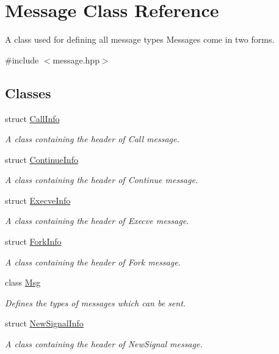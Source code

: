 \hypertarget{class_message}{\section{Message Class Reference}
\label{class_message}
}


A class used for defining all message types Messages come in two forms.  




{\ttfamily \#include $<$message.\-hpp$>$}

\subsection*{Classes}
\begin{DoxyCompactItemize}
\item 
struct \hyperlink{struct_message_1_1_call_info}{Call\-Info}
\begin{DoxyCompactList}\small\item\em A class containing the header of Call message. \end{DoxyCompactList}\item 
struct \hyperlink{struct_message_1_1_continue_info}{Continue\-Info}
\begin{DoxyCompactList}\small\item\em A class containing the header of Continue message. \end{DoxyCompactList}\item 
struct \hyperlink{struct_message_1_1_execve_info}{Execve\-Info}
\begin{DoxyCompactList}\small\item\em A class containing the header of Execve message. \end{DoxyCompactList}\item 
struct \hyperlink{struct_message_1_1_fork_info}{Fork\-Info}
\begin{DoxyCompactList}\small\item\em A class containing the header of Fork message. \end{DoxyCompactList}\item 
class \hyperlink{class_message_1_1_msg}{Msg}
\begin{DoxyCompactList}\small\item\em Defines the types of messages which can be sent. \end{DoxyCompactList}\item 
struct \hyperlink{struct_message_1_1_new_signal_info}{New\-Signal\-Info}
\begin{DoxyCompactList}\small\item\em A class containing the header of New\-Signal message. \end{DoxyCompactList}\item 

\end{DoxyCompactItemize}
